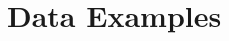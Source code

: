 \documentclass[11pt]{article}
\begin{document}
%
%
%
%
%




\section{Data Examples}\label{sec: real data analysis}
\end{document}
